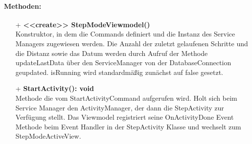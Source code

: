 \documentclass[a4paper,12pt]{article}
\begin{document}
\paragraph{Methoden:}
\begin{itemize}
	\item[+] \textbf{<<create>> StepModeViewmodel()}\\ Konstruktor, in dem die Commands definiert und die Instanz des Service Managers zugewiesen werden. Die Anzahl der zuletzt gelaufenen Schritte und die Distanz sowie das Datum werden durch Aufruf der Methode updateLastData über den ServiceManager von der DatabaseConnection geupdated. isRunning wird standardmäßig zunächst auf false gesetzt.
	\item[+] \textbf{StartActivity(): void}\\ Methode die vom StartActivityCommand aufgerufen wird. Holt sich beim Service Manager den ActivityManager, der dann die StepActivity zur Verfügung stellt. Das Viewmodel registriert seine OnActivityDone Event Methode beim Event Handler in der StepActivity Klasse und wechselt zum StepModeActiveView. 

\end{itemize}
\end{document}
